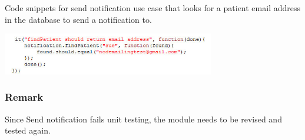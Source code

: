 Code snippets for send notification use case that looks for a patient email address in the database to send a notification to.	
\newline

\includegraphics[width=350px]{./Graphics/find}

\subsubsection*{Remark}
Since Send notification fails unit testing, the module needs to be revised and tested again.
